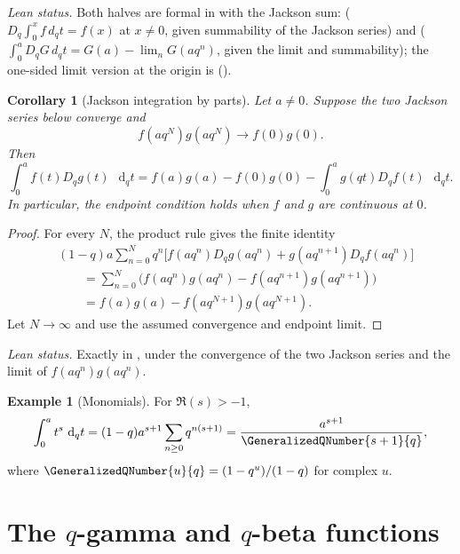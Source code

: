 \documentclass[11pt,a4paper,oneside,openany]{book}
\newtheorem{corollary}[corollary]{Corollary}
\theoremstyle{definition}
\newtheorem{example}[example]{Example}
\theoremstyle{remark}
\newcommand{\JacksonDifferential}[2]{\mathop{}\!\mathrm d_{#1}#2}
\begin{document}
\emph{Lean status.}  Both halves are formal in  with
 the Jackson sum: 
($D_q\int_0^x f\,d_qt=f(x)$ at $x\ne0$, given summability of the Jackson series) and
 ($\int_0^a D_qG\,d_qt=G(a)-\lim_nG(aq^n)$, given the
limit and summability); the one-sided limit version at the origin is
().


\begin{corollary}[Jackson integration by parts]\label{cor:q-integration-parts}
Let $a\ne0$.  Suppose the two Jackson series below converge and
\[
 f(aq^N)g(aq^N)\longrightarrow f(0)g(0).
\]
Then
\[
 \int_0^a f(t)D_qg(t)\,\JacksonDifferential{q}{t}
 =f(a)g(a)-f(0)g(0)
 -\int_0^a g(qt)D_qf(t)\,\JacksonDifferential{q}{t}.
\]
In particular, the endpoint condition holds when $f$ and $g$ are continuous
at $0$.
\end{corollary}

\begin{proof}
For every $N$, the product rule gives the finite identity
\begin{align*}
 &(1-q)a\sum_{n=0}^{N}q^n
 \bigl[f(aq^n)D_qg(aq^n)+g(aq^{n+1})D_qf(aq^n)\bigr]\\
 &\qquad=\sum_{n=0}^{N}
 \bigl(f(aq^n)g(aq^n)-f(aq^{n+1})g(aq^{n+1})\bigr)\\
 &\qquad=f(a)g(a)-f(aq^{N+1})g(aq^{N+1}).
\end{align*}
Let $N\to\infty$ and use the assumed convergence and endpoint limit.
\end{proof}

\emph{Lean status.}  Exactly  in
, under the convergence of the two Jackson series and the limit
of $f(aq^n)g(aq^n)$.


\begin{example}[Monomials]
For $\Re(s)>-1$,
\[
 \int_0^a t^s\,\JacksonDifferential{q}{t}
 =(1-q)a^{s+1}\sum_{n\ge0}q^{n(s+1)}
 =\frac{a^{s+1}}{\GeneralizedQNumber{s+1}{q}},
\]
where $\GeneralizedQNumber{u}{q}=(1-q^u)/(1-q)$ for complex $u$.
\end{example}

\chapter{The \texorpdfstring{$q$}{q}-gamma and \texorpdfstring{$q$}{q}-beta functions}\label{chap:qgamma}
\end{document}
